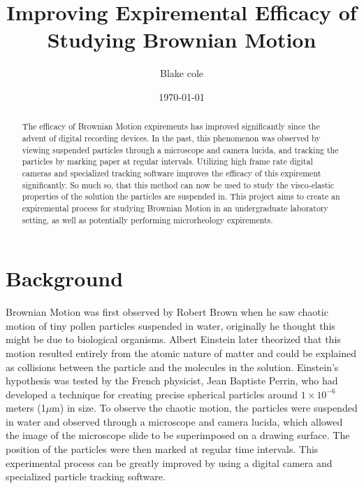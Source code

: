 \documentclass[aps,prb,twocolumn,groupedaddress,nofootinbib,floatfix]{revtex4}
\begin{document}
%
\title{Improving Expiremental Efficacy of Studying Brownian Motion}

%
\author{Blake cole}
%
%
%
%

\date{\today}

\begin{abstract} \noindent 

The efficacy of Brownian Motion expirements has improved significantly since the advent of digital recording devices. In the past, this phenomenon was observed by viewing suspended particles through a microscope and camera lucida, and tracking the particles by marking paper at regular intervals. Utilizing high frame rate digital cameras and specialized tracking software improves the efficacy of this expirement significantly. So much so, that this method can now be used to study the visco-elastic properties of the solution the particles are suspended in. This project aims to create an expiremental process for studying Brownian Motion in an undergraduate laboratory setting, as well as potentially performing microrheology expirements.  

\end{abstract}

\maketitle

\section*{Background}
Brownian Motion was first observed by Robert Brown when he saw chaotic motion of tiny pollen particles suspended in water, originally he thought this might be due to biological organisms. Albert Einstein later theorized that this motion resulted entirely from the atomic nature of matter and could be explained as collisions between the particle and the molecules in the solution. Einstein's hypothesis was tested by the French physicist, Jean Baptiste Perrin, who had developed a technique for creating precise spherical particles around $1 \times 10^{-6}$ meters (1$\mu$m) in size. To observe the chaotic motion, the particles were suspended in water and observed through a microscope and camera lucida, which allowed the image of the microscope slide to be superimposed on a drawing surface. The position of the particles were then marked at regular time intervals. This experimental process can be greatly improved by using a digital camera and specialized particle tracking software. 
\end{document}
